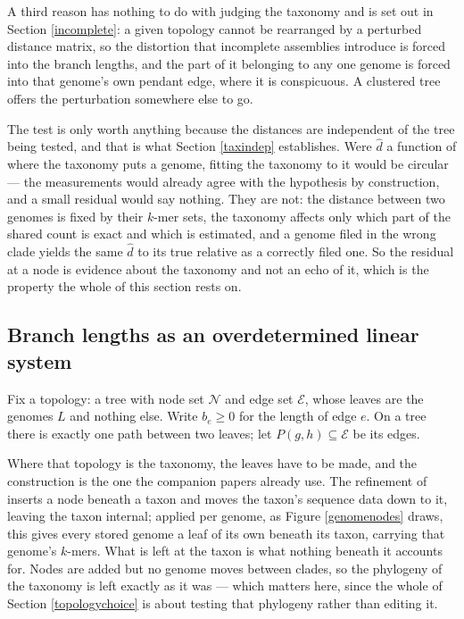 \documentclass[pdflatex,sn-vancouver-num]{sn-jnl}
\begin{document}
A third reason has nothing to do with judging the taxonomy and is set out in
Section \ref{incomplete}: a given topology cannot be rearranged by a perturbed distance matrix, so
the distortion that incomplete assemblies introduce is forced into the branch lengths, and the part
of it belonging to any one genome is forced into that genome's own pendant edge, where it is
conspicuous. A clustered tree offers the perturbation somewhere else to go.

The test is only worth anything because the distances are independent of the tree being tested, and
that is what Section \ref{taxindep} establishes. Were $\widehat{d}$ a function of where the taxonomy
puts a genome, fitting the taxonomy to it would be circular --- the measurements would already agree
with the hypothesis by construction, and a small residual would say nothing. They are not: the
distance between two genomes is fixed by their $k$-mer sets, the taxonomy affects only which part of
the shared count is exact and which is estimated, and a genome filed in the wrong clade yields the
same $\widehat{d}$ to its true relative as a correctly filed one. So the residual at a node is
evidence about the taxonomy and not an echo of it, which is the property the whole of this section
rests on.

\subsection{Branch lengths as an overdetermined linear system}

Fix a topology: a tree with node set $\mathcal{N}$ and edge set $\mathcal{E}$, whose leaves are the
genomes $L$ and nothing else. Write $b_e \geq 0$ for the length of edge $e$. On a tree there is
exactly one path between two leaves; let $P(g,h) \subseteq \mathcal{E}$ be its edges.

Where that topology is the taxonomy, the leaves have to be made, and the construction is the one the
companion papers already use. The refinement of \citet{genestrip-ft} inserts a node beneath a taxon and moves
the taxon's sequence data down to it, leaving the taxon internal; applied per genome, as
Figure \ref{genomenodes} draws, this gives every stored genome a leaf of its own beneath its taxon,
carrying that genome's $k$-mers. What is left at the taxon is what nothing beneath it accounts for.
Nodes are added but no genome moves between clades, so the phylogeny of the taxonomy is left exactly
as it was --- which matters here, since the whole of Section \ref{topologychoice} is about testing
that phylogeny rather than editing it.
\end{document}
